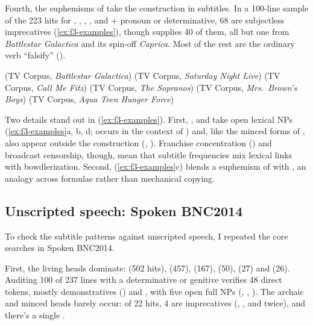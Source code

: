 \documentclass[12pt]{article}
\begin{document}
Fourth, the euphemisms of  take the construction in subtitles. In a 100-line sample of the 223 hits for , , , ,  and  + pronoun or determinative, 68 are subjectless imprecatives (\ref{ex:f3-examples}), though  supplies 40 of them, all but one from \emph{Battlestar Galactica} and its spin-off \emph{Caprica}. Most of the rest are the ordinary verb  \enquote{falsify} ().

\ea\label{ex:f3-examples}
\ea {} \hfill (TV Corpus, \emph{Battlestar Galactica})
\ex {} \hfill (TV Corpus, \emph{Saturday Night Live})
\ex {} \hfill (TV Corpus, \emph{Call Me Fitz})
\ex {} \hfill (TV Corpus, \emph{The Sopranos})
\ex {} \hfill (TV Corpus, \emph{Mrs.\ Brown's Boys})
\ex {} \hfill (TV Corpus, \emph{Aqua Teen Hunger Force})
\z
\z

Two details stand out in (\ref{ex:f3-examples}). First, ,  and  take open lexical NPs (\ref{ex:f3-examples}a, b, d;  occurs in the context of ) and, like the minced forms of , also appear outside the construction (, ). Franchise concentration () and broadcast censorship, though, mean that subtitle frequencies mix lexical links with bowdlerization. Second,  (\ref{ex:f3-examples}c) blends a euphemism of  with , an analogy across formulae rather than mechanical copying.

\subsection{Unscripted speech: Spoken BNC2014}
\label{sec:bnc2014}

To check the subtitle patterns against unscripted speech, I repeated the core searches in Spoken BNC2014.

First, the living heads dominate:  (502 hits),  (457),  (167),  (50),  (27) and  (26). Auditing 100 of 237 lines with a determinative or genitive verifies 48 direct tokens, mostly demonstratives () and , with five open full NPs (, , ). The archaic and minced heads barely occur: of 22 hits, 4 are imprecatives (, , and  twice), and there's a single .
\end{document}
